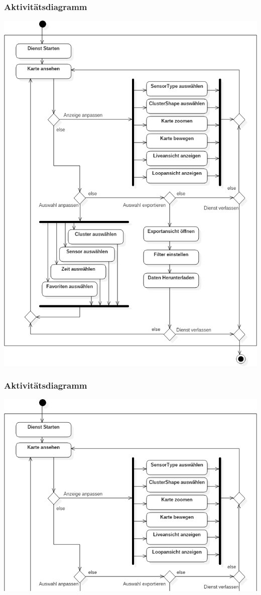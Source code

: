 \documentclass{beamer}
\begin{document}
\begin{frame}
	\frametitle{Aktivitätsdiagramm}
	\centering
	\includegraphics[height=0.85\textheight]{diagrams/ActivityDiagram1}
\end{frame}

\begin{frame}
	\frametitle{Aktivitätsdiagramm}
	\centering
	\includegraphics[width=\linewidth]{diagrams/ActivityDiagram1Top}
\end{frame}
\end{document}
